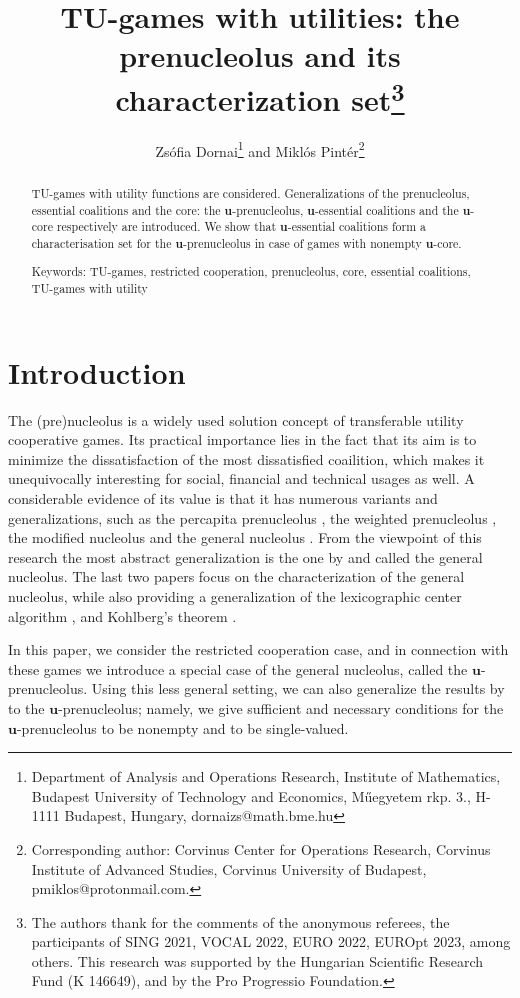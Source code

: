 \documentclass[a4paper,12pt]{article}
\title{TU-games with utilities: the prenucleolus and its characterization set\thanks{The authors thank for the comments of the anonymous referees, the participants of SING 2021, VOCAL 2022, EURO 2022, EUROpt 2023, among others. This research was supported by the Hungarian Scientific Research Fund (K 146649), and by the Pro Progressio Foundation.}}
\author{Zsófia Dornai\thanks{Department of Analysis and Operations Research, Institute of Mathematics, Budapest University of Technology and Economics, Műegyetem rkp. 3., H-1111 Budapest, Hungary,  dornaizs@math.bme.hu} and Miklós Pintér\thanks{Corresponding author: Corvinus Center for Operations Research, Corvinus Institute of Advanced Studies, Corvinus University of Budapest, pmiklos@protonmail.com.}}
\theoremstyle{definition}
\theoremstyle{remark}
\begin{document}
\maketitle

\begin{abstract}
TU-games with utility functions are considered. Generalizations of the prenucleolus, essential coalitions and the core: the $\mathbf{u}$-prenucleo\-lus, $\mathbf{u}$-essential coalitions and the $\mathbf{u}$-core respectively are introduced. We show that $\mathbf{u}$-essential coalitions form a characterisation set for the $\mathbf{u}$-prenucleolus in case of  games with nonempty $\mathbf{u}$-core.

\bigskip

Keywords: TU-games, restricted cooperation, prenucleolus, core, essential coalitions, TU-games with utility
\end{abstract}


\section{Introduction}

The (pre)nucleolus \citep{Schmeidler1969} is a widely used solution concept of transferable utility cooperative games. Its practical importance lies in the fact that its aim is to minimize the dissatisfaction of the most dissatisfied coailition, which makes it unequivocally interesting for social, financial and technical usages as well. A considerable evidence of its value is that it has numerous variants and generalizations, such as the percapita prenucleolus \citep{Grotte1970,Grotte1972}, the weighted prenucleolus \citep{DerksHaller1999}, the modified nucleolus \citep{Sudholter1996,Sudholter1997} and the general nucleolus \citep{PottersTijs1992,MaschlerPottersTijs1992}. From the viewpoint of this research the most abstract generalization is the one by \citet{PottersTijs1992} and \citet{MaschlerPottersTijs1992} called the general nucleolus. The last two papers focus on the characterization of the general nucleolus, while also providing a generalization of the lexicographic center algorithm \citep{MaschlerPelegShapley1979}, and Kohlberg's theorem \citep{Kohlberg1971}. %

In this paper, we consider the restricted cooperation case, and in connection with these games we introduce a special case of the general nucleolus, called the $\mathbf{u}$-prenucleolus. Using this less general setting, we can also generalize the results by \citeauthor{Katsev2013} to the $\mathbf{u}$-prenucleolus; namely, we give sufficient and necessary conditions for the $\mathbf{u}$-prenucleolus to be nonempty and to be single-valued.
\end{document}
